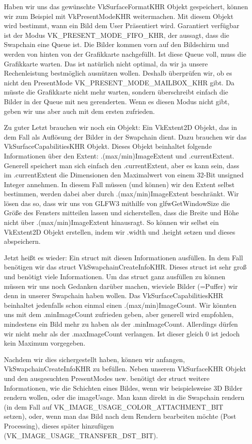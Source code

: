 \documentclass[11pt,a4paper]{report}
\begin{document}
Haben wir uns das gewünschte VkSurfaceFormatKHR Objekt gespeichert, können wir zum Beispiel mit VkPresentModeKHR weitermachen. Mit diesem Objekt wird bestimmt, wann ein Bild dem User Präsentiert wird. Garantiert verfügbar ist der Modus VK\_PRESENT\_MODE\_FIFO\_KHR, der aussagt, dass die Swapchain eine Queue ist. Die Bilder kommen vorn auf den Bildschirm und werden von hinten von der Grafikkarte nachgefüllt. Ist diese Queue voll, muss die Grafikkarte warten. Das ist natürlich nicht optimal, da wir ja unsere Rechenleistung bestmöglich ausnützen wollen. Deshalb überprüfen wir, ob es nicht den PresentMode VK\_PRESENT\_MODE\_MAILBOX\_KHR gibt. Da müsste die Grafikkarte nicht mehr warten, sondern überschreibt einfach die Bilder in der Queue mit neu gerenderten. Wenn es diesen Modus nicht gibt, geben wir uns aber auch mit dem ersten zufrieden.

Zu guter Letzt brauchen wir noch ein Objekt: Ein VkExtent2D Objekt, das in dem Fall als Auflösung der Bilder in der Swapchain dient. Dazu brauchen wir das VkSurfaceCapabilitiesKHR Objekt. Dieses Objekt beinhaltet folgende Informationen über den Extent: .(max/min)ImageExtent und .currentExtent. Generell speichert man sich einfach den .currentExtent, aber es kann sein, dass im .currentExtent die Dimensionen den Maximalwert von einem 32-Bit unsigned Integer annehmen. In diesem Fall müssen (und können) wir den Extent selbst bestimmen, werden dabei aber durch .(max/min)ImageExtent beschränkt. Wir lösen das so, dass wir uns von GLFW3 mithilfe von glfwGetWindowSize die Größe des Fensters mitteilen lassen und sicherstellen, dass die Breite und Höhe nicht über .(max/min)ImageExtent hinausragt. So können wir selbst ein VkExtent2D Objekt erstellen, indem wir .width und .height setzen und dieses abspeichern.

Jetzt heißt es wieder: Ein struct mit diesen Informationen ausfüllen. In dem Fall benötigen wir das struct VkSwapchainCreateInfoKHR. Dieses struct ist sehr groß und benötigt viele Informationen. Um das struct ganz ausfüllen zu können müssen wir uns noch Gedanken darüber machen, wieviele Bilder (=Puffer) wir denn in unserer Swapchain haben wollen. Das VkSurfaceCapabilitiesKHR beinhaltet jedenfalls schon einmal einen .(max/min)ImageCount. Wir könnten uns mit dem .minImageCount zufrieden geben, aber generell wird empfohlen, mindestens ein Bild mehr zu haben als der .minImageCount. Allerdings dürfen wir nicht mehr als der .maxImageCount verlangen. Ist dieser gleich 0 ist jedoch kein Maximum vorgegeben.

Nachdem wir dies sichergestellt haben, können wir anfangen, VkSwapchainCreateInfoKHR zu befüllen. Neben unserem VkSurfaceKHR Objekt und den ausgesuchten PresentModes usw. benötigt der struct weitere Informationen, wie die Schichten eines Bildes, wenn wir beispielsweise 3D Bilder rendern wollen, oder die imageUsage. Man kann direkt in die Swapchain rendern (in dem Fall auf VK\_IMAGE\_USAGE\_COLOR\_ATTACHMENT\_BIT setzen), oder, wenn man das Bild nach dem Rendern bearbeiten möchte (Post Processing), dieses später hinzufügen (VK\_IMAGE\_USAGE\_TRANSFER\_DST\_BIT).
\end{document}
